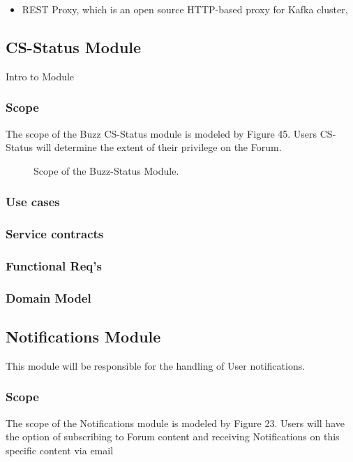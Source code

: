 \documentclass[12pt]{article}
\begin{document}
\begin{itemize} 
\item  REST Proxy, which is an open source HTTP-based proxy for Kafka cluster, 
\end{itemize}

\subsection{CS-Status Module}
\par{Intro to Module}
\subsubsection{Scope}
\par{The scope of the Buzz CS-Status module is modeled by Figure 45. Users CS-Status will determine the extent of their privilege on the Forum.}

\begin{figure}[h]
\iffalse\texttt{[image: Diagrams/scopeStatus.jpeg]}\fi
\caption{Scope of the Buzz-Status Module.}
\label{Use-case: Buzz-Status Module}
\end{figure}

\subsubsection{Use cases}
\subsubsection{Service contracts}
\subsubsection{Functional Req's}
\subsubsection{Domain Model}


\subsection{Notifications Module}
\par{This module will be responsible for the handling of User notifications.}
\subsubsection{Scope}
\par{The scope of the Notifications module is modeled by Figure 23. Users will have the option of subscribing to Forum content and receiving Notifications on this specific content via email}
\end{document}
